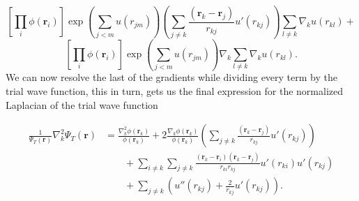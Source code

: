 \documentclass[11pt,a4paper,titlepage]{article}
\begin{document}
\begin{equation*}
\left[\prod_{i}\phi(\mathbf{r}_i)\right]\exp{\left(\sum_{j<m}u(r_{jm})\right)}\left(\sum_{j\ne k}\frac{(\mathbf{r}_k-\mathbf{r}_j)}{r_{kj}}u'(r_{kj})\right)\sum_{l\ne k}\nabla_k u(r_{kl}) + 
\end{equation*}
\begin{equation*}
\left[\prod_i\phi(\mathbf{r}_i)\right]
  \exp{\left(\sum_{j<m}u(r_{jm})\right)}\nabla_k\sum_{l\ne k}\nabla_k u(r_{kl}).
\end{equation*}
We can now resolve the last of the gradients while dividing every term by the trial wave function, this in turn, gets us the final expression for the normalized Laplacian of the trial wave function

\begin{align}
   \frac{1}{\Psi_T(\mathbf{r})}\nabla_k^2\Psi_T(\mathbf{r})
   &= \frac{\nabla_k^2\phi(\mathbf{r}_k)}{\phi(\mathbf{r}_k)}
   + 2\frac{\nabla_k\phi(\mathbf{r}_k)}{\phi(\mathbf{r}_k)}
   \left(\sum_{j\ne k}\frac{(\mathbf{r}_k-\mathbf{r}_j)}{r_{kj}}u'(r_{kj})\right)
   \\
   &\qquad
   + \sum_{i\ne k}\sum_{j \ne k}\frac{(\mathbf{r}_k-\mathbf{r}_i)(\mathbf{r}_k-\mathbf{r}_j)}{r_{ki}r_{kj}}u'(r_{ki})u'(r_{kj})
   \\
   &\qquad
   + \sum_{j\ne k}\left( u''(r_{kj})+\frac{2}{r_{kj}}u'(r_{kj})\right).
\end{align}


\end{document}
